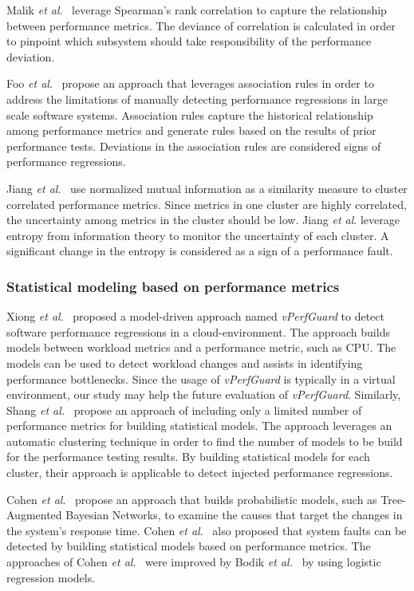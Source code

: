 \documentclass[smallextended]{svjour3}       %
\begin{document}
Malik \emph{et al$.$}~\cite{5635038} leverage Spearman's rank correlation to capture the relationship between performance metrics. The deviance of correlation is calculated in order to pinpoint which subsystem should take responsibility of the performance deviation.

Foo\emph{ et al$.$}~\cite{foo2010mining} propose an approach that leverages association rules in order to address the limitations of manually detecting performance regressions in large scale software systems. Association rules capture the historical relationship among performance metrics and generate rules based on the results of prior performance tests. Deviations in the association rules are considered signs of performance regressions.

Jiang \emph{et al$.$}~\cite{5270324} use normalized mutual information as a similarity measure to cluster correlated performance metrics. Since metrics in one cluster are highly correlated, the uncertainty among metrics in the cluster should be low. Jiang \emph{et al$.$} leverage entropy from information theory to monitor the uncertainty of each cluster. A significant change in the entropy is considered as a sign of a performance fault. 


\subsubsection{Statistical modeling based on performance metrics}
\label{sec:relatedmodel}

Xiong \textit{et al$.$}~\cite{xiong2013vperfguard} proposed a model-driven approach named \textit{vPerfGuard} to detect software performance regressions in a cloud-environment. The approach builds models between workload metrics and a performance metric, such as CPU. The models can be used to detect workload changes and assists in identifying performance bottlenecks. Since the usage of \emph{vPerfGuard} is typically in a virtual environment, our study may help the future evaluation of \textit{vPerfGuard}. Similarly, Shang\textit{ et al.}~\cite{Shang:2015:ADP:2668930.2688052} propose an approach of including only a limited number of performance metrics for building statistical models. The approach leverages an automatic clustering technique in order to find the number of models to be build for the performance testing results. By building statistical models for each cluster, their approach is applicable to detect injected performance regressions. 

Cohen \textit{et al$.$}~\cite{cohen2004correlating} propose an approach that builds probabilistic models, such as Tree-Augmented Bayesian Networks, to examine the causes that target the changes in the system's response time. Cohen \textit{et al$.$}~\cite{Cohen:2005:CIC:1095810.1095821} also proposed that system faults can be detected by building statistical models based on performance metrics. The approaches of Cohen \textit{et al$.$}~\cite{cohen2004correlating, Cohen:2005:CIC:1095810.1095821} were improved by Bodik \textit{et al.}~\cite{bodik2008hilighter} by using logistic regression models.
\end{document}
